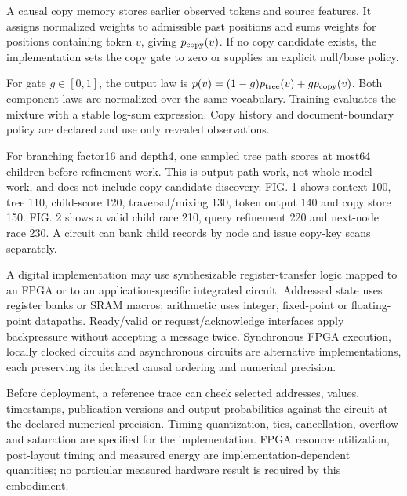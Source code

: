 \documentclass[pct]{sm-patent}
\begin{document}
\pnum A causal copy memory stores earlier observed tokens and source features. It assigns normalized weights to admissible past positions and sums weights for positions containing token $v$, giving $p_{\rm copy}(v)$. If no copy candidate exists, the implementation sets the copy gate to zero or supplies an explicit null/base policy.

\pnum For gate $g\in[0,1]$, the output law is $p(v)=(1-g)p_{\rm tree}(v)+gp_{\rm copy}(v)$. Both component laws are normalized over the same vocabulary. Training evaluates the mixture with a stable log-sum expression. Copy history and document-boundary policy are declared and use only revealed observations.

\pnum For branching factor16 and depth4, one sampled tree path scores at most64 children before refinement work. This is output-path work, not whole-model work, and does not include copy-candidate discovery. FIG. 1 shows context 100, tree 110, child-score 120, traversal/mixing 130, token output 140 and copy store 150. FIG. 2 shows a valid child race 210, query refinement 220 and next-node race 230. A circuit can bank child records by node and issue copy-key scans separately.


\pnum A digital implementation may use synthesizable register-transfer logic mapped to an FPGA or to an application-specific integrated circuit. Addressed state uses register banks or SRAM macros; arithmetic uses integer, fixed-point or floating-point datapaths. Ready/valid or request/acknowledge interfaces apply backpressure without accepting a message twice. Synchronous FPGA execution, locally clocked circuits and asynchronous circuits are alternative implementations, each preserving its declared causal ordering and numerical precision.

\pnum Before deployment, a reference trace can check selected addresses, values, timestamps, publication versions and output probabilities against the circuit at the declared numerical precision. Timing quantization, ties, cancellation, overflow and saturation are specified for the implementation. FPGA resource utilization, post-layout timing and measured energy are implementation-dependent quantities; no particular measured hardware result is required by this embodiment.

\claimsstart
\end{document}
